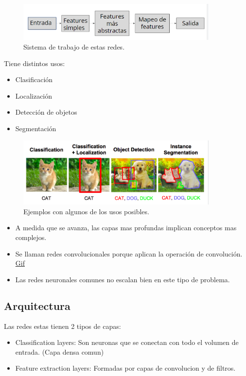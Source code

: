 \documentclass[titlepage,a4paper]{article}
\begin{document}
\begin{figure}[!htb]
    \centering
    \includegraphics[width=0.9\textwidth]{imagenesResumen/RedesConvolucionalesSistema.PNG}
    \caption{Sistema de trabajo de estas redes.}
\end{figure}

Tiene distintos usos:
\begin{itemize}
    \item Clasificación
    \item Localización
    \item Detección de objetos
    \item Segmentación
\end{itemize}

\begin{figure}[!htb]
    \centering
    \includegraphics[width=0.9\textwidth]{imagenesResumen/TiposDeUsosRedesConvolucionales.PNG}
    \caption{Ejemplos con algunos de los usos posibles.}
\end{figure}

\begin{itemize}
    \item A medida que se avanza, las capas mas profundas implican conceptos mas complejos.
    \item Se llaman redes convolucionales porque aplican la operación de convolución. \href{https://i1.wp.com/datasmarts.net/es/wp-content/uploads/2018/11/full_padding_no_strides_transposed.gif?resize=264\%2C300&ssl=1}{Gif}
    \item Las redes neuronales comunes no escalan bien en este tipo de problema.
\end{itemize}

\subsection*{Arquitectura}
Las redes estas tienen 2 tipos de capas:
\begin{itemize}
    \item Classification layers: Son neuronas que se conectan con todo el volumen de entrada. (Capa densa comun)
    \item Feature extraction layers: Formadas por capas de convolucion y de filtros.
\end{itemize}
\end{document}
